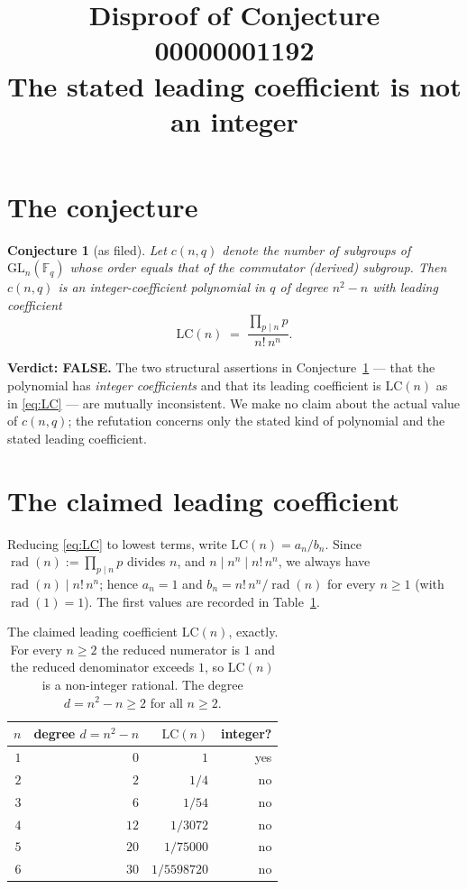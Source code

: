 \documentclass[11pt]{article}
\title{Disproof of Conjecture 00000001192\\[2pt]
\large The stated leading coefficient is not an integer}
\author{}
\date{}
\newtheorem{conjecture}{Conjecture}
\theoremstyle{remark}
\newcommand{\GL}{\mathrm{GL}}
\newcommand{\Fq}{\mathbb{F}_q}
\newcommand{\LC}{\mathrm{LC}}
\DeclareMathOperator{\rad}{rad}
\begin{document}
\maketitle

\section{The conjecture}

\begin{conjecture}[as filed]\label{conj}
Let $c(n,q)$ denote the number of subgroups of $\GL_n(\Fq)$ whose order equals
that of the commutator (derived) subgroup. Then $c(n,q)$ is an
\emph{integer-coefficient} polynomial in $q$ of degree $n^2-n$ with leading
coefficient
\begin{equation}\label{eq:LC}
  \LC(n) \;=\; \frac{\prod_{p \mid n} p}{n!\, n^{n}} .
\end{equation}
\end{conjecture}

\medskip
\noindent\textbf{Verdict: FALSE.} The two structural assertions in
Conjecture~\ref{conj} --- that the polynomial has \emph{integer coefficients}
and that its leading coefficient is $\LC(n)$ as in \eqref{eq:LC} --- are
mutually inconsistent. We make no claim about the actual value of $c(n,q)$;
the refutation concerns only the stated kind of polynomial and the stated
leading coefficient.

\section{The claimed leading coefficient}

Reducing \eqref{eq:LC} to lowest terms, write $\LC(n) = a_n / b_n$. Since
$\rad(n) := \prod_{p\mid n} p$ divides $n$, and $n \mid n^n \mid n!\,n^n$, we
always have $\rad(n) \mid n!\,n^n$; hence $a_n = 1$ and
$b_n = n!\,n^n / \rad(n)$ for every $n \ge 1$ (with $\rad(1)=1$). The first
values are recorded in Table~\ref{tab:lc}.

\begin{table}[h]
\centering
\begin{tabular}{@{}rrrr@{}}
\toprule
$n$ & degree $d=n^2-n$ & $\LC(n)$ & integer?\\
\midrule
$1$ & $0$  & $1$              & yes\\
$2$ & $2$  & $1/4$            & no\\
$3$ & $6$  & $1/54$           & no\\
$4$ & $12$ & $1/3072$         & no\\
$5$ & $20$ & $1/75000$        & no\\
$6$ & $30$ & $1/5598720$      & no\\
\bottomrule
\end{tabular}
\caption{The claimed leading coefficient $\LC(n)$, exactly. For every $n\ge2$
the reduced numerator is $1$ and the reduced denominator exceeds $1$, so
$\LC(n)$ is a non-integer rational. The degree $d=n^2-n\ge2$ for all $n\ge2$.}
\label{tab:lc}
\end{table}
\end{document}
